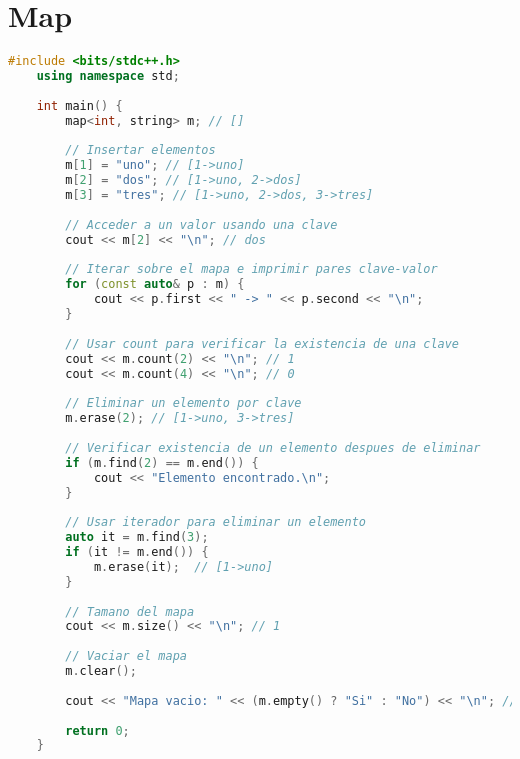 
\section*{Map}

\begin{lstlisting}[language=C++]
	#include <bits/stdc++.h>
	using namespace std;
	
	int main() {
		map<int, string> m; // []
		
		// Insertar elementos
		m[1] = "uno"; // [1->uno]
		m[2] = "dos"; // [1->uno, 2->dos]
		m[3] = "tres"; // [1->uno, 2->dos, 3->tres]
		
		// Acceder a un valor usando una clave
		cout << m[2] << "\n"; // dos
		
		// Iterar sobre el mapa e imprimir pares clave-valor
		for (const auto& p : m) {
			cout << p.first << " -> " << p.second << "\n";
		}
		
		// Usar count para verificar la existencia de una clave
		cout << m.count(2) << "\n"; // 1
		cout << m.count(4) << "\n"; // 0
		
		// Eliminar un elemento por clave
		m.erase(2); // [1->uno, 3->tres]
		
		// Verificar existencia de un elemento despues de eliminar
		if (m.find(2) == m.end()) {
			cout << "Elemento encontrado.\n"; 
		}
		
		// Usar iterador para eliminar un elemento
		auto it = m.find(3); 
		if (it != m.end()) {
			m.erase(it);  // [1->uno]
		}
		
		// Tamano del mapa
		cout << m.size() << "\n"; // 1
		
		// Vaciar el mapa
		m.clear();
		
		cout << "Mapa vacio: " << (m.empty() ? "Si" : "No") << "\n"; // Si
		
		return 0;
	}
\end{lstlisting}
